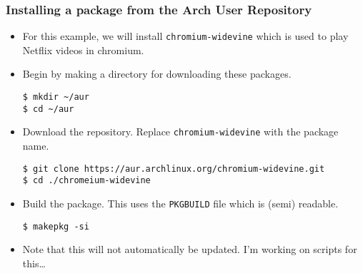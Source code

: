 \documentclass{article}
\begin{document}
    \subsubsection{Installing a package from the Arch User Repository}
      \begin{itemize}
        \item For this example, we will install \verb|chromium-widevine| which
          is used to play Netflix videos in chromium.
        \item Begin by making a directory for downloading these packages.
\begin{verbatim}
$ mkdir ~/aur
$ cd ~/aur
\end{verbatim}
        \item Download the repository. Replace \verb|chromium-widevine| with
          the package name.
\begin{verbatim}
$ git clone https://aur.archlinux.org/chromium-widevine.git
$ cd ./chromeium-widevine
\end{verbatim}
        \item Build the package. This uses the \verb|PKGBUILD| file which is
          (semi) readable.
\begin{verbatim}
$ makepkg -si
\end{verbatim}
        \item
          Note that this will not automatically be updated. I'm working on
          scripts for this\ldots{}
      \end{itemize}
\end{document}
